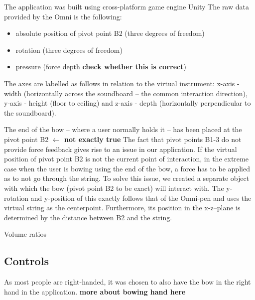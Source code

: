 \documentclass{article}
\begin{document}
The application was built using cross-platform game engine Unity \cite{unity}
The raw data provided by the Omni is the following:
\begin{itemize}
    \item absolute position of pivot point B2 (three degrees of freedom)
    \item rotation (three degrees of freedom)
    \item pressure (force depth \textbf{check whether this is correct})
\end{itemize}

The axes are labelled as follows in relation to the virtual instrument: x-axis - width (horizontally across the soundboard -- the common interaction direction), y-axis - height (floor to ceiling) and z-axis - depth (horizontally perpendicular to the soundboard).


The end of the bow -- where a user normally holds it -- has been placed at the pivot point B2 \textbf{$\leftarrow$ not exactly true}
The fact that pivot points B1-3 do not provide force feedback gives rise to an issue in our application. If the virtual
position of pivot point B2 is not the current point of interaction, in the extreme case when the user is bowing using the end of the bow, a force has to be applied as to not go through the string. To solve this issue, we created a separate object with which the bow (pivot point B2 to be exact) will interact with. The y-rotation and y-position of this exactly follows that of the Omni-pen and uses the virtual string as the centerpoint. Furthermore, its position in the x-z--plane is determined by the distance between B2 and the string.

Volume ratios

\subsection{Controls}
As most people are right-handed, it was chosen to also have the bow in the right hand in the application. \textbf{more about bowing hand here}
\end{document}
